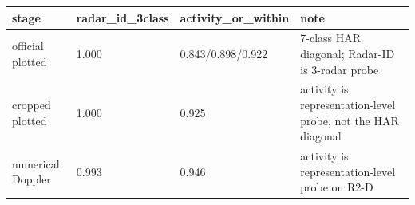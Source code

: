 \begin{tabular}{llll}
\hline
stage & radar\_id\_3class & activity\_or\_within & note \\
\hline
official plotted & 1.000 & 0.843/0.898/0.922 & 7-class HAR diagonal; Radar-ID is 3-radar probe \\
cropped plotted & 1.000 & 0.925 & activity is representation-level probe, not the HAR diagonal \\
numerical Doppler & 0.993 & 0.946 & activity is representation-level probe on R2-D \\
\hline
\end{tabular}

